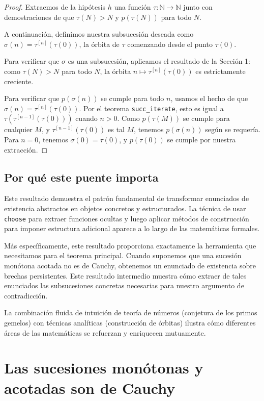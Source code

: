 \begin{proof}
Extraemos de la hipótesis $h$ una función $\tau : \mathbb{N} \to \mathbb{N}$
junto con demostraciones de que $\tau(N) > N$ y $p(\tau(N))$ para todo $N$.

A continuación, definimos nuestra subsucesión deseada como
$\sigma(n) = \tau^{[n]}(\tau(0))$, la órbita de $\tau$ comenzando desde
el punto $\tau(0)$.

Para verificar que $\sigma$ es una subsucesión, aplicamos el resultado de
la Sección 1: como $\tau(N) > N$ para todo $N$, la órbita
$n \mapsto \tau^{[n]}(\tau(0))$ es estrictamente creciente.

Para verificar que $p(\sigma(n))$ se cumple para todo $n$, usamos el
hecho de que $\sigma(n) = \tau^{[n]}(\tau(0))$. Por el teorema
\texttt{succ\_iterate}, esto es igual a $\tau(\tau^{[n-1]}(\tau(0)))$
cuando $n > 0$. Como $p(\tau(M))$ se cumple para cualquier $M$, y
$\tau^{[n-1]}(\tau(0))$ es tal $M$, tenemos $p(\sigma(n))$ según se
requería. Para $n = 0$, tenemos $\sigma(0) = \tau(0)$, y $p(\tau(0))$ se
cumple por nuestra extracción.
\end{proof}

\subsection{Por qué este puente importa}

Este resultado demuestra el patrón fundamental de transformar enunciados
de existencia abstractos en objetos concretos y estructurados. La técnica
de usar \texttt{choose} para extraer funciones ocultas y luego aplicar
métodos de construcción para imponer estructura adicional aparece a lo
largo de las matemáticas formales.

Más específicamente, este resultado proporciona exactamente la herramienta
que necesitamos para el teorema principal. Cuando suponemos que una
sucesión monótona acotada no es de Cauchy, obtenemos un enunciado de
existencia sobre brechas persistentes. Este resultado intermedio muestra
cómo extraer de tales enunciados las subsucesiones concretas necesarias
para nuestro argumento de contradicción.

La combinación fluida de intuición de teoría de números (conjetura de los
primos gemelos) con técnicas analíticas (construcción de órbitas) ilustra
cómo diferentes áreas de las matemáticas se refuerzan y enriquecen
mutuamente.

\section{Las sucesiones monótonas y acotadas son de Cauchy}

